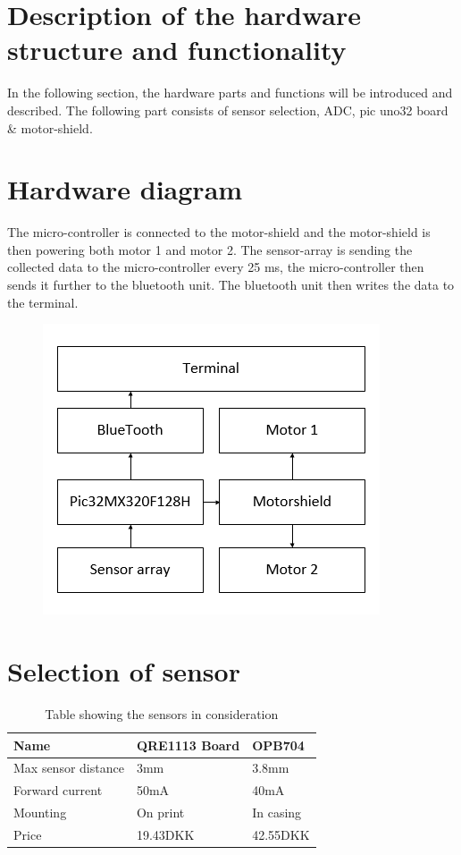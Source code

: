 \section{Description of the hardware structure and functionality}
In the following section, the hardware parts and functions will be introduced and described. The following part consists of sensor selection, ADC, pic uno32 board \& motor-shield.

\section{Hardware diagram}
The micro-controller is connected to the motor-shield and the motor-shield is then powering both motor 1 and motor 2. The sensor-array is sending the collected data to the micro-controller every 25 ms, the micro-controller then sends it further to the bluetooth unit. The bluetooth unit then writes the data to the terminal. 


 \begin{figure}[!ht]
    	\centering    		\includegraphics[width=.6\textwidth]{figures/hardwaredia2.png}
    	\caption{}
    	\label{Hardware diagram}
    \end{figure}

\section{Selection of sensor}

\begin{table}[]
\centering
\caption{Table showing the sensors in consideration}
\label{Sensor table}
\begin{tabular}{|l|l|l|}
\hline
Name                & QRE1113 Board & OPB704    \\ \hline
Max sensor distance & 3mm           & 3.8mm     \\ \hline
Forward current     & 50mA          & 40mA      \\ \hline
Mounting            & On print      & In casing \\ \hline
Price               & 19.43DKK      & 42.55DKK  \\ \hline
\end{tabular}
\end{table}



